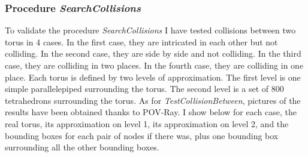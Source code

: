 \documentclass[12pt, a4paper]{article}
\begin{document}
\noindent{}
\noindent{}


\subsubsection{Procedure {\em SearchCollisions}}

To validate the procedure {\em SearchCollisions} I have tested collisions between two torus in 4 cases. In the first case, they are intricated in each other but not colliding. In the second case, they are side by side and not colliding. In the third case, they are colliding in two places. In the fourth case, they are colliding in one place. Each torus is defined by two levels of approximation. The first level is one simple parallelepiped surrounding the torus. The second level is a set of 800 tetrahedrons surrounding the torus.
As for {\em TestCollisionBetween}, pictures of the results have been obtained thanks to POV-Ray. I show below for each case, the real torus, its approximation on level 1, its approximation on level 2, and the bounding boxes for each pair of nodes if there was, plus one bounding box surrounding all the other bounding boxes.\\
\end{document}
